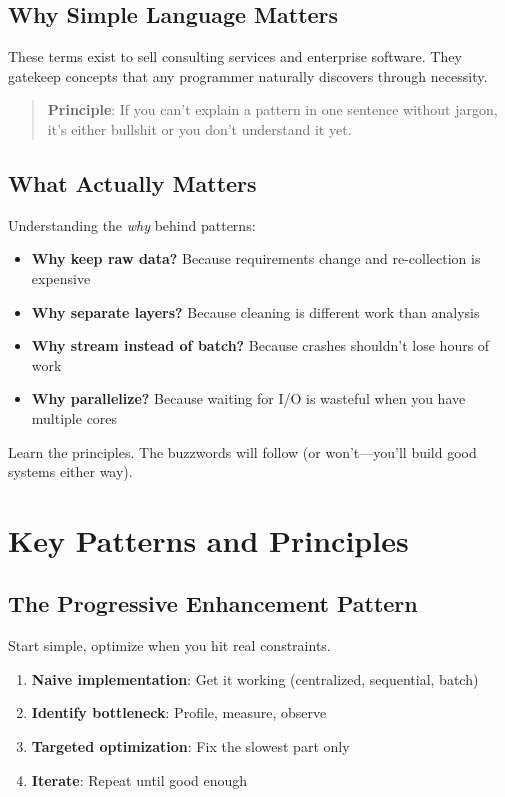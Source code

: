 \documentclass[11pt,a4paper]{article}
\begin{document}
\subsection{Why Simple Language Matters}

These terms exist to sell consulting services and enterprise software. They gatekeep concepts that any programmer naturally discovers through necessity.

\begin{quote}
\textbf{Principle}: If you can't explain a pattern in one sentence without jargon, it's either bullshit or you don't understand it yet.
\end{quote}

\subsection{What Actually Matters}

Understanding the \textit{why} behind patterns:

\begin{itemize}
    \item \textbf{Why keep raw data?} Because requirements change and re-collection is expensive
    \item \textbf{Why separate layers?} Because cleaning is different work than analysis
    \item \textbf{Why stream instead of batch?} Because crashes shouldn't lose hours of work
    \item \textbf{Why parallelize?} Because waiting for I/O is wasteful when you have multiple cores
\end{itemize}

Learn the principles. The buzzwords will follow (or won't—you'll build good systems either way).

\section{Key Patterns and Principles}

\subsection{The Progressive Enhancement Pattern}

Start simple, optimize when you hit real constraints.

\begin{enumerate}
    \item \textbf{Naive implementation}: Get it working (centralized, sequential, batch)
    \item \textbf{Identify bottleneck}: Profile, measure, observe
    \item \textbf{Targeted optimization}: Fix the slowest part only
    \item \textbf{Iterate}: Repeat until good enough
\end{enumerate}
\end{document}
